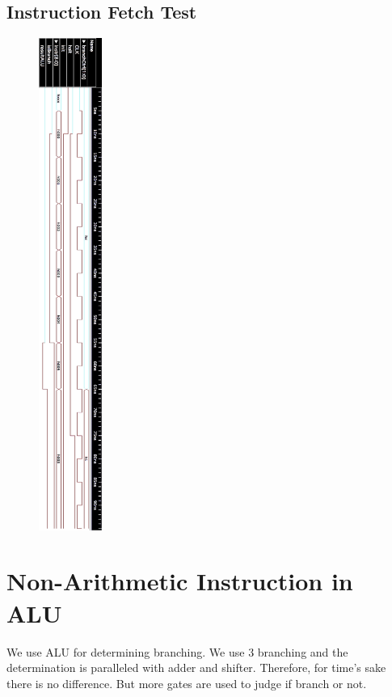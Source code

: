 \documentclass{article}
\begin{document}
    \subsection{Instruction Fetch Test}
    \vspace{-10mm}
    \begin{figure}[H]
      \includegraphics[width=0.185\textwidth, right]{IFTest.png}
    \end{figure}
    \newpage
  \section{Non-Arithmetic Instruction in ALU}
    \quad We use ALU for determining branching. We use 3 branching
    and the determination is paralleled with adder and shifter.
    Therefore, for time's sake there is no difference. But more
    gates are used to judge if branch or not.
\end{document}
